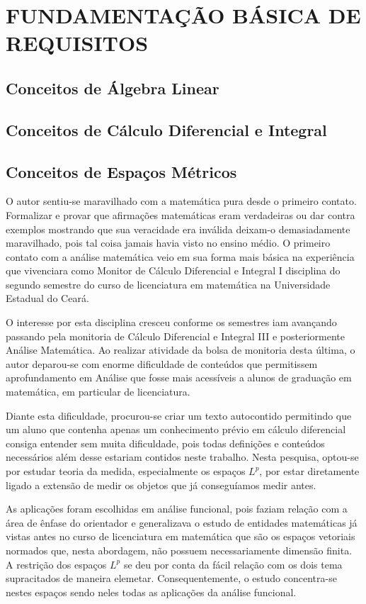\chapter{FUNDAMENTAÇÃO BÁSICA DE REQUISITOS}

\section{Conceitos de Álgebra Linear}
\section{Conceitos de Cálculo Diferencial e Integral}
\section{Conceitos de Espaços Métricos}

    O autor sentiu-se maravilhado com a matemática pura desde o primeiro contato. 
    Formalizar e provar que afirmações matemáticas eram verdadeiras ou dar contra exemplos mostrando que sua veracidade era inválida deixam-o demasiadamente maravilhado, pois tal coisa jamais havia visto no ensino médio.
    O primeiro contato com a análise matemática veio em sua forma mais básica na experiência que vivenciara como Monitor de Cálculo Diferencial e Integral I disciplina do segundo semestre do curso de licenciatura em matemática na Universidade Estadual do Ceará.

    O interesse por esta disciplina cresceu conforme os semestres iam avançando passando pela monitoria de Cálculo Diferencial e Integral III e posteriormente Análise Matemática.
    Ao realizar atividade da bolsa de monitoria desta última, o autor deparou-se com enorme dificuldade de conteúdos que permitissem aprofundamento em Análise que fosse mais acessíveis a alunos de graduação em matemática, em particular de licenciatura.

    Diante esta dificuldade, procurou-se criar um texto autocontido permitindo que um aluno que contenha apenas um conhecimento prévio em cálculo diferencial consiga entender sem muita dificuldade, pois todas definições e conteúdos necessários além desse estariam contidos neste trabalho.
    Nesta pesquisa, optou-se por estudar teoria da medida, especialmente os espaços $L^p$, por estar diretamente ligado a extensão de medir os objetos que já conseguíamos medir antes.

    As aplicações foram escolhidas em análise funcional, pois faziam relação com a área de ênfase do orientador e generalizava o estudo de entidades matemáticas já vistas antes no curso de licenciatura em matemática que são os espaços vetoriais normados que, nesta abordagem, não possuem necessariamente dimensão finita. A restrição dos espaços $L^p$ se deu por conta da fácil relação com os dois tema supracitados de maneira elemetar. Consequentemente, o estudo concentra-se nestes espaços sendo neles todas as aplicações da análise funcional.
    